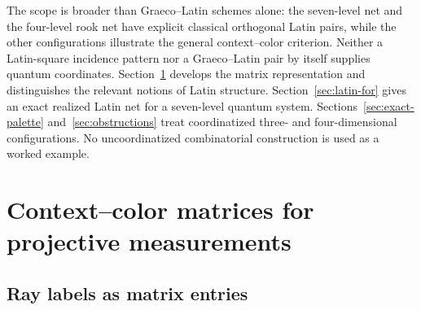 \documentclass[aps,pra,reprint,superscriptaddress,longbibliography,nofootinbib,floatfix,10pt]{revtex4-2}
\theoremstyle{definition}\newtheorem{definition}[theorem]{Definition}
\theoremstyle{remark}\newtheorem{remark}[theorem]{Remark}
\begin{document}
The scope is broader than Graeco--Latin schemes alone: the seven-level net and the four-level rook net have explicit classical orthogonal Latin pairs, while the other configurations illustrate the general context--color criterion. Neither a Latin-square incidence pattern nor a Graeco--Latin pair by itself supplies quantum coordinates. Section~\ref{sec:framework} develops the matrix representation and distinguishes the relevant notions of Latin structure. Section~\ref{sec:latin-for} gives an exact realized Latin net for a seven-level quantum system. Sections~\ref{sec:exact-palette} and~\ref{sec:obstructions} treat coordinatized three- and four-dimensional configurations. No uncoordinatized combinatorial construction is used as a worked example.



\section{Context--color matrices for projective measurements}\label{sec:framework}
\subsection{Ray labels as matrix entries}\label{sec:nxd-matrix}
\end{document}
